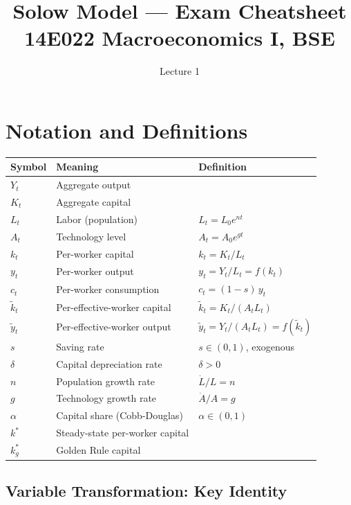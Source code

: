 \documentclass[a4paper,11pt]{article}
\title{\textbf{Solow Model --- Exam Cheatsheet}\\
\large 14E022 Macroeconomics I, BSE}
\author{}
\date{Lecture 1}
\newcommand{\ktilde}{\tilde{k}}
\newcommand{\ytilde}{\tilde{y}}
\begin{document}
\maketitle
\tableofcontents
\newpage

\section{Notation and Definitions}

\begin{center}
\begin{tabular}{lll}
\toprule
\textbf{Symbol} & \textbf{Meaning} & \textbf{Definition} \\
\midrule
$Y_t$ & Aggregate output & \\
$K_t$ & Aggregate capital & \\
$L_t$ & Labor (population) & $L_t = L_0 e^{nt}$ \\
$A_t$ & Technology level & $A_t = A_0 e^{gt}$ \\
$k_t$ & Per-worker capital & $k_t = K_t / L_t$ \\
$y_t$ & Per-worker output & $y_t = Y_t / L_t = f(k_t)$ \\
$c_t$ & Per-worker consumption & $c_t = (1-s)\,y_t$ \\
$\ktilde_t$ & Per-effective-worker capital & $\ktilde_t = K_t/(A_t L_t)$ \\
$\ytilde_t$ & Per-effective-worker output & $\ytilde_t = Y_t/(A_t L_t) = f(\ktilde_t)$ \\
$s$ & Saving rate & $s \in (0,1)$, exogenous \\
$\delta$ & Capital depreciation rate & $\delta > 0$ \\
$n$ & Population growth rate & $\dot{L}/L = n$ \\
$g$ & Technology growth rate & $\dot{A}/A = g$ \\
$\alpha$ & Capital share (Cobb-Douglas) & $\alpha \in (0,1)$ \\
$k^*$ & Steady-state per-worker capital & \\
$k_g^*$ & Golden Rule capital & \\
\bottomrule
\end{tabular}
\end{center}

\subsection*{Variable Transformation: Key Identity}
\end{document}
